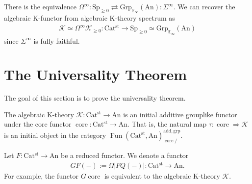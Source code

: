 \documentclass[a4paper,dvipdfmx,11pt,reqno]{amsart}
\DeclareMathOperator{\Fun}{Fun}
\DeclareMathOperator{\core}{core}
\newcommand{\K}{\mathcal{K}}
\newcommand{\An}{\mathrm{An}}
\newcommand{\Catst}{\mathrm{Cat^{st}}}
\newcommand{\Grp}{\mathrm{Grp}_{\mathbb{E}_{\infty}}}
\newcommand{\Sp}{\mathrm{Sp}}
\begin{document}
\begin{remark}
  There is the equivalence $\Omega^\infty : \Sp_{\geq 0} \rightleftarrows \Grp(\An) : \Sigma^\infty$.
  We can recover the algebraic K-functor from algebraic K-theory spectrum as 
  \begin{align*}
    \K \simeq \Omega^\infty \K_{\geq 0} :  \Catst \to \Sp_{\geq 0} \simeq \Grp(\An) 
  \end{align*}
  since $\Sigma^\infty$ is fully faithful.
\end{remark}


\section{The Universality Theorem}

The goal of this section is to prove the universality theorem.

\begin{theorem} \label{thrm.universality_theorem}
  The algebraic K-theory $\K : \Catst \to \An$ is an initial additive grouplike functor under the core functor $\core : \Catst \to \An$.
  That is, the natural map $\tau : \core \Rightarrow \K$ is an initial object in the category $\Fun(\Catst,\An)^{\mathrm{add,grp}}_{\core/}$.
\end{theorem}

\begin{notation}
  Let $F : \Catst \to \An$ be a reduced functor.
  We denote a functor 
  \begin{align*}
    GF(-) := \Omega|FQ(-)| : \Catst \to \An. 
  \end{align*}
  For example, the functor $G\core$ is equivalent to the algebraic K-theory $\K$.
\end{notation}
\end{document}
